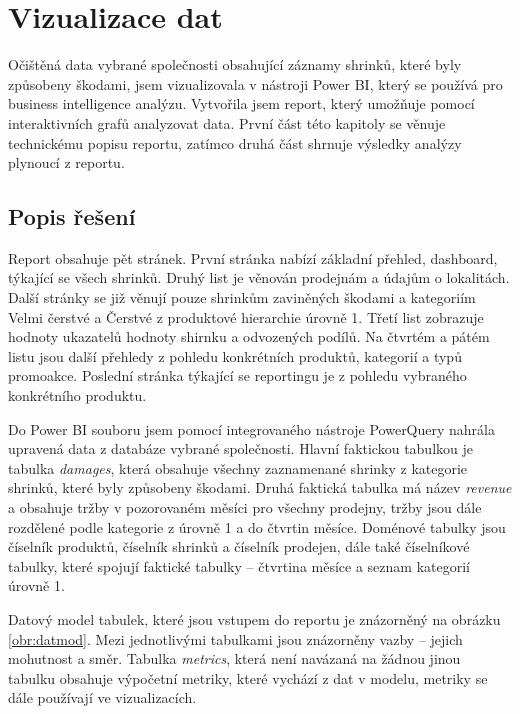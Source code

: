 \chapter{Vizualizace dat}
\label{ch:vizualizace}

Očištěná data vybrané společnosti obsahující záznamy shrinků, které byly způsobeny škodami, jsem vizualizovala v nástroji Power BI, který se používá pro business intelligence analýzu. Vytvořila jsem report, který umožňuje pomocí interaktivních grafů analyzovat data. První část této kapitoly se věnuje technickému popisu reportu, zatímco druhá část shrnuje výsledky analýzy plynoucí z reportu.

\section{Popis řešení}
\label{sec:vizualizace:popis}

Report obsahuje pět stránek. První stránka nabízí základní přehled, dashboard, týkající se všech shrinků. Druhý list je věnován prodejnám a údajům o lokalitách.
Další stránky se již věnují pouze shrinkům zaviněných škodami a kategoriím Velmi čerstvé a Čerstvé z produktové hierarchie úrovně 1. Třetí list zobrazuje hodnoty ukazatelů hodnoty shirnku a odvozených podílů. Na čtvrtém a pátém listu jsou další přehledy z pohledu konkrétních produktů, kategorií a typů promoakce. Poslední stránka týkající se reportingu je z pohledu vybraného konkrétního produktu.

Do Power BI souboru jsem pomocí integrovaného nástroje PowerQuery nahrála upravená data z databáze vybrané společnosti. Hlavní faktickou tabulkou je tabulka \emph{damages}, která obsahuje všechny zaznamenané shrinky z kategorie shrinků, které byly způsobeny škodami. Druhá faktická tabulka má název \emph{revenue} a obsahuje tržby v pozorovaném měsíci pro všechny prodejny, tržby jsou dále rozdělené podle kategorie z úrovně 1 a do čtvrtin měsíce. Doménové tabulky jsou číselník produktů, číselník shrinků a číselník prodejen, dále také číselníkové tabulky, které spojují faktické tabulky -- čtvrtina měsíce a seznam kategorií úrovně 1. 

Datový model tabulek, které jsou vstupem do reportu je znázorněný na obrázku \ref{obr:datmod}. Mezi jednotlivými tabulkami jsou znázorněny vazby -- jejich mohutnost a směr. Tabulka \emph{metrics}, která není navázaná na žádnou jinou tabulku obsahuje výpočetní metriky, které vychází z dat v modelu, metriky se dále používají ve vizualizacích.


